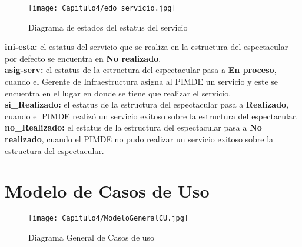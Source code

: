 \begin{figure}[htbp!]
    \centering
    \texttt{[image: Capitulo4/edo\_servicio.jpg]}
    \caption{Diagrama de estados del estatus del servicio}
    \label{fig:my_label}
\end{figure}
\textbf{ini-esta:} 
el estatus del servicio que se realiza en la estructura del espectacular por defecto se encuentra en \textbf{No realizado}.
\\
\textbf{asig-serv:}
el estatus de la estructura del espectacular pasa a \textbf{En proceso}, cuando el Gerente de Infraestructura asigna al PIMDE un servicio y este se encuentra en el lugar en donde se tiene que realizar el servicio.
\\
\textbf{si\_Realizado:}
el estatus de la estructura del espectacular pasa a \textbf{Realizado}, cuando el PIMDE realizó un servicio exitoso sobre la estructura del espectacular.
\\
\textbf{no\_Realizado:}
el estatus de la estructura del espectacular pasa a \textbf{No realizado}, cuando el PIMDE no pudo realizar un servicio exitoso sobre la estructura del espectacular.
\clearpage

\section{Modelo de Casos de Uso}

\begin{figure}[htbp!]
    \centering
    \texttt{[image: Capitulo4/ModeloGeneralCU.jpg]}
    \caption{Diagrama General de Casos de uso}
    \label{fig:my_label}
\end{figure}









%
%
%






%
%
%
%

